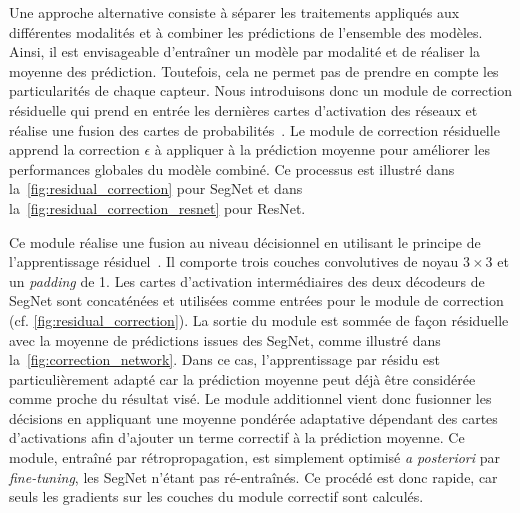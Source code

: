 Une approche alternative consiste à séparer les traitements appliqués aux différentes modalités et à combiner les prédictions de l'ensemble des modèles. Ainsi, il est envisageable d'entraîner un modèle par modalité et de réaliser la moyenne des prédiction. Toutefois, cela ne permet pas de prendre en compte les particularités de chaque capteur. Nous introduisons donc un module de correction résiduelle qui prend en entrée les dernières cartes d'activation des réseaux et réalise une fusion des cartes de probabilités~\cite{audebert_semantic_2016}. Le module de correction résiduelle apprend la correction $\epsilon$ à appliquer à la prédiction moyenne pour améliorer les performances globales du modèle combiné. Ce processus est illustré dans la~\cref{fig:residual_correction} pour SegNet et dans la~\cref{fig:residual_correction_resnet} pour ResNet.

Ce module réalise une fusion au niveau décisionnel en utilisant le principe de l'apprentissage résiduel~\cite{he_deep_2016}. Il comporte trois couches convolutives de noyau $3\times3$ et un \emph{padding} de \SI{1}{\px}. Les cartes d'activation intermédiaires des deux décodeurs de SegNet sont concaténées et utilisées comme entrées pour le module de correction (cf. \cref{fig:residual_correction}). La sortie du module est sommée de façon résiduelle avec la moyenne de prédictions issues des SegNet, comme illustré dans la~\cref{fig:correction_network}. Dans ce cas, l'apprentissage par résidu est particulièrement adapté car la prédiction moyenne peut déjà être considérée comme proche du résultat visé. Le module additionnel vient donc fusionner les décisions en appliquant une moyenne pondérée adaptative dépendant des cartes d'activations afin d'ajouter un terme correctif à la prédiction moyenne. Ce module, entraîné par rétropropagation, est simplement optimisé \emph{a posteriori} par \emph{fine-tuning}, les SegNet n'étant pas ré-entraînés. Ce procédé est donc rapide, car seuls les gradients sur les couches du module correctif sont calculés.



